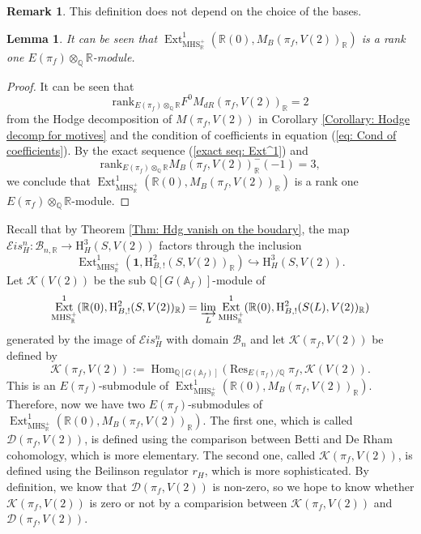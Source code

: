 \documentclass[11pt, a4paper]{amsart}
\theoremstyle{plain}
\newtheorem{lemma}[theorem]{Lemma}
\theoremstyle{definition}
\newtheorem{remark}[theorem]{Remark}
\numberwithin{equation}{section}
\def\QQ{\mathbb{Q}}
\def\RR{\mathbb{R}}
\DeclareMathOperator{\Res}{Res}
\DeclareMathOperator{\Hom}{Hom}
\DeclareMathOperator{\Ext}{Ext}
\begin{document}
\begin{remark}
    This definition does not depend on the choice of the bases. 
\end{remark}

\begin{lemma}
    It can be seen that $\Ext^{1}_{\mathrm{MHS_{\RR}^{+}}}(\RR(0), M_{B}(\pi_f, V(2))_{\RR})$ is a rank one $E(\pi_f) \otimes_{\QQ} \RR$-module. 
\end{lemma}

\begin{proof}
    It can be seen that 
    \begin{equation*}
        \mathrm{rank}_{E(\pi_f) \otimes_{\QQ} \RR} F^{0}M_{dR}(\pi_f, V(2))_{\RR} = 2
    \end{equation*}
    from the Hodge decomposition of $M(\pi_f, V(2))$ in Corollary \ref{Corollary: Hodge decomp for motives} and the condition of coefficients in equation (\ref{eq: Cond of coefficients}). By the exact sequence (\ref{exact seq: Ext^1}) and 
    \begin{equation*}
        \mathrm{rank}_{E(\pi_f) \otimes_{\QQ} \RR} M_{B}(\pi_f, V(2))^{-}_{\RR}(-1) = 3, 
    \end{equation*}
    we conclude that $\Ext^{1}_{\mathrm{MHS_{\RR}^{+}}}(\RR(0), M_{B}(\pi_f, V(2))_{\RR})$ is a rank one $E(\pi_f) \otimes_{\QQ} \RR$-module. 
\end{proof}

Recall that by Theorem \ref{Thm: Hdg vanish on the boudary}, the map $\mathcal{E}is_{H}^n \colon \mathcal{B}_{n,\RR} \rightarrow \mathrm{H}^{3}_{H}(S, V(2))$ factors through the inclusion 
\[
    \Ext^{1}_{\mathrm{MHS}_{\RR}^{+}}(\mathbf{1}, \mathrm{H}^{2}_{B,!}(S, V(2))_{\RR}) \hookrightarrow \mathrm{H}^{3}_{H}(S, V(2)).
\]Let $\mathcal{K}(V(2))$ be the sub $\QQ[G(\mathbb{A}_{f})]$-module of 
\begin{equation*}
    \Ext^{1}_{\mathrm{MHS_{\RR}^{+}}}(\RR(0), \mathrm{H}^{2}_{B, !}(S, V(2))_{\RR}) = \varinjlim_{L}  \Ext^{1}_{\mathrm{MHS_{\RR}^{+}}}(\RR(0), \mathrm{H}^{2}_{B, !}(S(L), V(2))_{\RR}) 
\end{equation*}
generated by the image of $\mathcal{E}is_{H}^{n}$ with domain $\mathcal{B}_{n}$ and let $\mathcal{K}(\pi_{f}, V(2))$ be defined by
\begin{equation}
\label{eq: K(pi, V)}
    \mathcal{K}(\pi_{f}, V(2)) := \Hom_{\QQ[G(\mathbb{A}_f)]}(\Res_{E(\pi_f)/\QQ}\pi_f, \mathcal{K}(V(2)). 
\end{equation}
This is an $E(\pi_f)$-submodule of $\Ext^{1}_{\mathrm{MHS_{\RR}^{+}}}(\RR(0), M_{B}(\pi_f, V(2))_{\RR})$. Therefore, now we have two $E(\pi_f)$-submodules of $\Ext^{1}_{\mathrm{MHS_{\RR}^{+}}}(\RR(0), M_{B}(\pi_f, V(2))_{\RR})$. The first one, which is called $\mathcal{D}(\pi_f, V(2))$, is defined using the comparison between Betti and De Rham cohomology, which is more elementary. The second one, called $\mathcal{K}(\pi_f, V(2))$, is defined using the Beilinson regulator $r_{H}$, which is more sophisticated. By definition, we know that 
$\mathcal{D}(\pi_f, V(2))$ is non-zero, so we hope to know whether $\mathcal{K}(\pi_f, V(2))$ is zero or not by a comparision between $\mathcal{K}(\pi_f, V(2))$ and $\mathcal{D}(\pi_f, V(2))$. 
\end{document}
